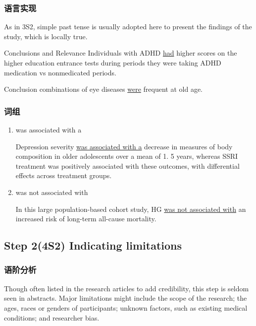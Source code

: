 \documentclass[a4paper]{ctexbook}
\begin{document}
    \subsubsection{语言实现}

    As in 3S2, simple past tense is usually adopted here to present the findings of the study, which is locally true.

    \begin{eg}{}
      Conclusions and Relevance Individuals with ADHD \uline{had} higher scores on the higher education entrance tests during periods they were taking ADHD medication vs nonmedicated periods.
    \end{eg}

    \begin{eg}{}
      Conclusion combinations of eye diseases \uline{were} frequent at old age. 
    \end{eg}

    \subsubsection{词组}

    \begin{enumerate}
      \item was associated with a
      \begin{eg}{}
        Depression severity \uline{was associated with a} decrease in measures of body composition in older adolescents over a mean of 1. 5 years, whereas SSRI treatment was positively associated with these outcomes, with differential effects across treatment groups.
      \end{eg}
      \item was not associated with
      \begin{eg}{}
        In this large population-based cohort study, HG \uline{was not associated with} an increased risk of long-term all-cause mortality.
      \end{eg}
    \end{enumerate}

  \subsection{Step 2(4S2) Indicating limitations}
    \subsubsection{语阶分析}

    Though often listed in the research articles to add credibility, this step is seldom seen in abstracts. Major limitations might include the scope of the research; the ages, races or genders of participants; unknown factors, such as existing medical conditions; and researcher bias.
\end{document}

